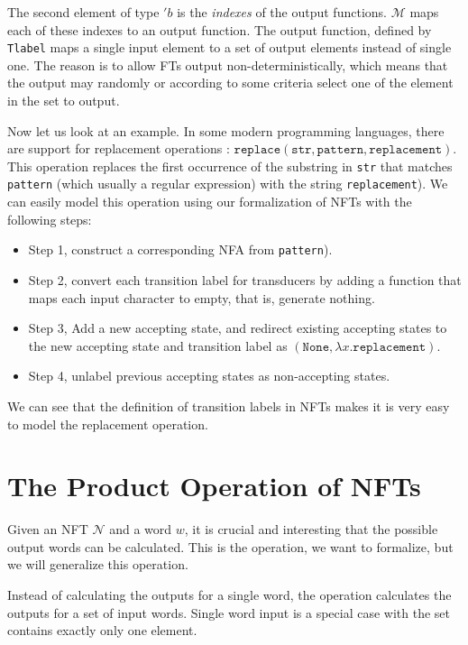 \documentclass[a4paper,UKenglish,cleveref, autoref, thm-restate]{lipics-v2021}
\begin{document}
The second element of type $'b$ is the \emph{indexes} of the output functions.  $\mathcal{M}$ maps each of these indexes to an output function. The output function, defined by \texttt{Tlabel} maps a single input element to a set of output elements instead of single one. The reason is to allow FTs output non-deterministically, which means that the output may randomly or according to some criteria select one of the element in the set to output.

Now let us look at an example. In some modern programming languages, there are support for replacement operations : $\texttt{replace}(\texttt{str}, \texttt{pattern}, \texttt{replacement})$. This operation replaces the first occurrence of the substring  in \texttt{str} that matches \texttt{pattern} (which usually a regular expression) with the string \texttt{replacement}). 
We can easily model this operation using our formalization of NFTs with the following steps:
\begin{itemize}
\item Step 1, construct a corresponding NFA from \texttt{pattern}).
\item Step 2, convert each transition label for transducers by adding a function that maps each input character to empty, that is, generate nothing.
\item Step 3, Add a new accepting state, and redirect existing accepting states to the new accepting state and transition label as $(\texttt{None}, \lambda x. \texttt{replacement})$.
\item Step 4, unlabel previous accepting states as non-accepting states. 
\end{itemize}

We can see that the definition of transition labels in NFTs makes it is very easy to model the replacement operation.

\section{The Product Operation of NFTs}
\label{sec-form-fts}

Given an NFT $\mathcal{N}$ and a word $w$, it is crucial and interesting that the possible output words can be calculated. This is the operation, we want to formalize, but we will generalize this operation.

Instead of calculating the outputs for a single word, the operation calculates the outputs for a set of input words. Single word input is a special case with the set contains exactly only one element.
\end{document}
